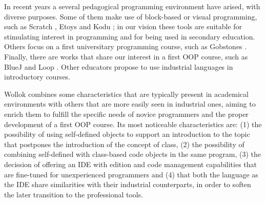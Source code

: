 


In recent years a several pedagogical programming environment have arised, with diverse purposes.
Some of them make use of block-based or visual programming, 
such as Scratch \cite{malan_scratch_2007}, Etoys \cite{lee_empowering_2011} and Kodu \cite{kodu};
in our vision these tools are suitable for stimulating interest in programming and for being used in secondary education.
Others focus on a first universitary programming course, such as Gobstones \cite{lopez_nombre_2012}
.
Finally, there are works that share our interest in a first OOP course, 
such as BlueJ \cite{bennedsen_bluej_2010} and Loop \cite{griggio_programming_2011}.
Other educators propose to use industrial languages in introductory courses.

Wollok combines some characteristics that are typically present in academical environments with others that are more easily seen in industrial ones, aiming to enrich them to fulfill the specific needs of novice programmers and the proper development of a first OOP course.
Its most noticeable characteristics are:
(1) the possibility of using self-defined objects to support an introduction to the topic that postpones the introduction of the concept of class,
(2) the possibility of combining self-defined with class-based code objects in the same program,
(3) the decission of offering an IDE with edition and code management capabilities that are fine-tuned for unexperienced programmers
and (4) that both the language as the IDE share similarities with their industrial counterparts, in order to soften the later transition to the professional tools.

